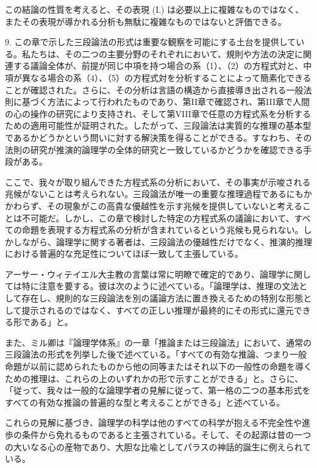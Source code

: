 \documentclass[a4paper,11pt,openany]{ltjsbook}
\begin{document}
この結論の性質を考えると、その表現 (I.) は必要以上に複雑なものではなく、またその表現が導かれる分析も無駄に複雑なものではないと評価できる。

9. この章で示した三段論法の形式は重要な観察を可能にする土台を提供している。私たちは、その二つの主要分野のそれぞれにおいて、規則や方法の決定に関連する議論全体が、前提が同じ中項を持つ場合の系（1）、（2）の方程式対と、中項が異なる場合の系（4）、（5）の方程式対を分析することによって簡素化できることが確認された。さらに、その分析は言語の構造から直接導き出される一般法則に基づく方法によって行われたものであり、第II章で確認され、第III章で人間の心の操作の研究により支持され、そして第VIII章で任意の方程式系を分析するための適用可能性が証明された。したがって、三段論法は実質的な推理の基本型であるかどうかという問いに対する解決策を得ることができる。すなわち、その法則の研究が推演的論理学の全体的研究と一致しているかどうかを確認できる手段がある。

ここで、我々が取り組んできた方程式系の分析において、その事実が示唆される兆候がないことは考えられない。三段論法が唯一の重要な推理過程であるにもかかわらず、その現象がこの高貴な優越性を示す兆候を提供していないと考えることは不可能だ。しかし、この章で検討した特定の方程式系の議論において、すべての命題を表現する方程式系の分析が含まれているという兆候も見られない。しかしながら、論理学に関する著者は、三段論法の優越性だけでなく、推演的推理における普遍的な充足性についてほぼ一致して主張している。

アーサー・ウィテイエル大主教の言葉は常に明瞭で確定的であり、論理学に関しては特に注意を要する。彼は次のように述べている。「論理学は、推理の文法として存在し、規則的な三段論法を別の議論方法に置き換えるための特別な形態として提示されるのではなく、すべての正しい推理が最終的にその形式に還元できる形である」と。

また、ミル卿は『論理学体系』の一章「推論または三段論法」において、通常の三段論法の形式を列挙した後で述べている。「すべての有効な推論、つまり一般命題が以前に認められたものから他の同等またはそれ以下の一般性の命題を導くための推理は、これらの上のいずれかの形で示すことができる」と。さらに、「従って、我々は一般的な論理学者の見解に従って、第一格の二つの基本形式をすべての有効な推論の普遍的な型と考えることができる」と述べている。

これらの見解に基づき、論理学の科学は他のすべての科学が抱える不完全性や進歩の条件から免れるものであると主張されている。そして、その起源は昔の一つの大いなる心の産物であり、大胆な比喩としてパラスの神話的誕生に例えられている。
\end{document}
